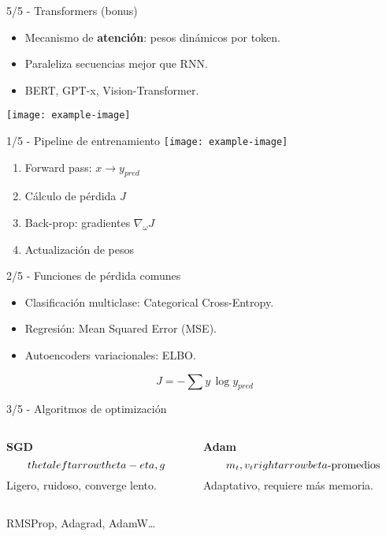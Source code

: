 \documentclass[12pt,spanish]{beamer}
\begin{document}
\begin{frame}{5/5  -  Transformers (bonus)}
  \begin{itemize}
    \item Mecanismo de \textbf{atención}: pesos dinámicos por token.
    \item Paraleliza secuencias mejor que RNN.
    \item BERT, GPT-x, Vision-Transformer.
  \end{itemize}
  \centering
  \texttt{[image: example-image]}
\end{frame}

\begin{frame}{1/5  -  Pipeline de entrenamiento}
  \texttt{[image: example-image]}
  \begin{enumerate}
    \item Forward pass: \(x \rightarrow y_{pred}\)
    \item Cálculo de pérdida \(J\)
    \item Back-prop: gradientes \(\nabla_{\!\omega}J\)
    \item Actualización de pesos
  \end{enumerate}
\end{frame}

\begin{frame}{2/5  -  Funciones de pérdida comunes}
  \begin{itemize}
    \item Clasificación multiclase: Categorical Cross-Entropy.
    \item Regresión: Mean Squared Error (MSE).
    \item Autoencoders variacionales: ELBO.
  \end{itemize}
  \[
    J = -\sum y\,\log y_{pred}
  \]
\end{frame}

\begin{frame}{3/5  -  Algoritmos de optimización}
  \begin{columns}[T]
    \begin{column}{.5\textwidth}
      \textbf{SGD}
      \[
        \\theta \\leftarrow \\theta - \\eta \\, g
      \]
      Ligero, ruidoso, converge lento.
    \end{column}
    \begin{column}{.5\textwidth}
      \textbf{Adam}
      \[
        m_t, v_t \\rightarrow \\beta\text{-promedios}
      \]
      Adaptativo, requiere más memoria.
    \end{column}
  \end{columns}
  \small RMSProp, Adagrad, AdamW…
\end{frame}
\end{document}
